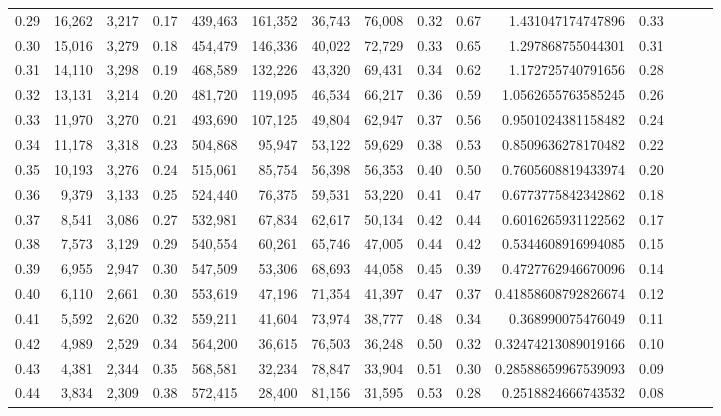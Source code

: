\begin{tabular}{rrrrrrrrrrrrrrr}
0.29 &  16,262 &  3,217 &  0.17 &  439,463 &  161,352 &   36,743 &   76,008 &  0.32 &  0.67 &       1.431047174747896 &      0.33 \\
0.30 &  15,016 &  3,279 &  0.18 &  454,479 &  146,336 &   40,022 &   72,729 &  0.33 &  0.65 &       1.297868755044301 &      0.31 \\
0.31 &  14,110 &  3,298 &  0.19 &  468,589 &  132,226 &   43,320 &   69,431 &  0.34 &  0.62 &       1.172725740791656 &      0.28 \\
0.32 &  13,131 &  3,214 &  0.20 &  481,720 &  119,095 &   46,534 &   66,217 &  0.36 &  0.59 &      1.0562655763585245 &      0.26 \\
0.33 &  11,970 &  3,270 &  0.21 &  493,690 &  107,125 &   49,804 &   62,947 &  0.37 &  0.56 &      0.9501024381158482 &      0.24 \\
0.34 &  11,178 &  3,318 &  0.23 &  504,868 &   95,947 &   53,122 &   59,629 &  0.38 &  0.53 &      0.8509636278170482 &      0.22 \\
0.35 &  10,193 &  3,276 &  0.24 &  515,061 &   85,754 &   56,398 &   56,353 &  0.40 &  0.50 &      0.7605608819433974 &      0.20 \\
0.36 &   9,379 &  3,133 &  0.25 &  524,440 &   76,375 &   59,531 &   53,220 &  0.41 &  0.47 &      0.6773775842342862 &      0.18 \\
0.37 &   8,541 &  3,086 &  0.27 &  532,981 &   67,834 &   62,617 &   50,134 &  0.42 &  0.44 &      0.6016265931122562 &      0.17 \\
0.38 &   7,573 &  3,129 &  0.29 &  540,554 &   60,261 &   65,746 &   47,005 &  0.44 &  0.42 &      0.5344608916994085 &      0.15 \\
0.39 &   6,955 &  2,947 &  0.30 &  547,509 &   53,306 &   68,693 &   44,058 &  0.45 &  0.39 &      0.4727762946670096 &      0.14 \\
0.40 &   6,110 &  2,661 &  0.30 &  553,619 &   47,196 &   71,354 &   41,397 &  0.47 &  0.37 &     0.41858608792826674 &      0.12 \\
0.41 &   5,592 &  2,620 &  0.32 &  559,211 &   41,604 &   73,974 &   38,777 &  0.48 &  0.34 &       0.368990075476049 &      0.11 \\
0.42 &   4,989 &  2,529 &  0.34 &  564,200 &   36,615 &   76,503 &   36,248 &  0.50 &  0.32 &     0.32474213089019166 &      0.10 \\
0.43 &   4,381 &  2,344 &  0.35 &  568,581 &   32,234 &   78,847 &   33,904 &  0.51 &  0.30 &     0.28588659967539093 &      0.09 \\
0.44 &   3,834 &  2,309 &  0.38 &  572,415 &   28,400 &   81,156 &   31,595 &  0.53 &  0.28 &      0.2518824666743532 &      0.08 \\

\end{tabular}
